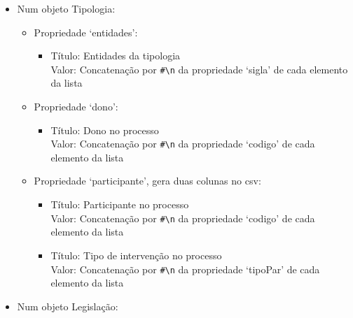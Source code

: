 \begin{itemize}
\begin{itemize}
\begin{itemize}
\begin{itemize}
                      Valor: Concatenação por \verb|#\n| da propriedade `tipoPar' de cada elemento da lista
            \end{itemize}
            \item Propriedade `tipologias':
            \begin{itemize}
                \item Título: Tipologias da entidade \\
                      Valor: Concatenação por \verb|#\n| da propriedade `sigla' de cada elemento da lista
            \end{itemize}
        \end{itemize}
        \item Num objeto Tipologia:
        \begin{itemize}
            \item Propriedade `entidades':
            \begin{itemize}
                \item Título: Entidades da tipologia \\
                      Valor: Concatenação por \verb|#\n| da propriedade `sigla' de cada elemento da lista
            \end{itemize}
            \item Propriedade `dono':
            \begin{itemize}
                \item Título: Dono no processo \\
                      Valor: Concatenação por \verb|#\n| da propriedade `codigo' de cada elemento da lista
            \end{itemize}
            \item Propriedade `participante', gera duas colunas no \acrshort{csv}:
            \begin{itemize}
                \item Título: Participante no processo \\
                      Valor: Concatenação por \verb|#\n| da propriedade `codigo' de cada elemento da lista
                \item Título: Tipo de intervenção no processo \\
                      Valor: Concatenação por \verb|#\n| da propriedade `tipoPar' de cada elemento da lista
            \end{itemize}
        \end{itemize}
        \item Num objeto Legislação:

\end{itemize}
\end{itemize}
